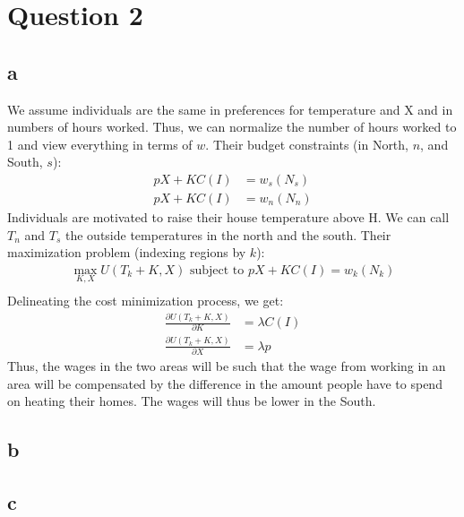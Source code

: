 \documentclass{article}
\begin{document}
\pagebreak
\section{Question 2}
\subsection{a}
We assume individuals are the same in preferences for temperature and X and in numbers of hours worked. Thus, we can normalize the number of hours worked to 1 and view everything in terms of $w$. Their budget constraints (in North, $n$, and South, $s$):
\begin{align*}
    pX + KC(I) &= w_s(N_s) \\
    pX + KC(I) &= w_n(N_n)
\end{align*}
Individuals are motivated to raise their house temperature above H. We can call $T_n$ and $T_s$ the outside temperatures in the north and the south. Their maximization problem (indexing regions by $k$):
\begin{align*}
    \max_{K,X} U(T_k + K,X) \text{ subject to } pX + KC(I) = w_k(N_k) \\
\end{align*}
Delineating the cost minimization process, we get:
\begin{align*}
    \frac{\partial U(T_k + K,X)}{\partial K}  &= \lambda C(I) \\
    \frac{\partial U(T_k + K,X)}{\partial X}  & = \lambda p
\end{align*}
Thus, the wages in the two areas will be such that the wage from working in an area will be compensated by the difference in the amount people have to spend on heating their homes. The wages will thus be lower in the South. 
\subsection{b}
\subsection{c}
\end{document}
